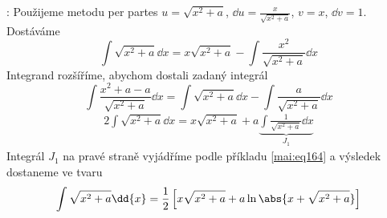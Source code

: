 \begin{mdframed}[style=mdmathsolution]
  [\ref{mai:eq143}]: Použijeme metodu per partes \(u =\sqrt{x^2+a}\), \(\dd{u} =
  \frac{x}{\sqrt{x^2+a}}\), \(v = x\), \(\dd{v} = 1\).  Dostáváme
  \begin{equation*}
    \int{\sqrt{x^2+a}\dd{x}} = x\sqrt{x^2+a}-\int{\frac{x^2}{\sqrt{x^2+a}}\dd{x}}
  \end{equation*}
  Integrand rozšíříme, abychom dostali zadaný integrál 
  \begin{equation*}
      \int\frac{x^2+a-a}{\sqrt{x^2+a}}\dd{x} 
        = \int{\sqrt{x^2+a}\dd{x}} - \int{\frac{a}{\sqrt{x^2+a}}\dd{x}}                   
  \end{equation*}
  \begin{align*}
    2\!\int{\sqrt{x^2+a}\dd{x}} 
      = x\sqrt{x^2+a}+a\underbrace{\int{\frac{1}{\sqrt{x^2+a}}}\dd{x}}_{J_1}
  \end{align*}    
  Integrál \(J_1\) na pravé straně vyjádříme podle příkladu \ref{mai:eq164} a výsledek
  dostaneme ve tvaru
  \begin{gather*}
    \int\sqrt{x^2+a}\dd{x}
        =\frac{1}{2}\left[x\sqrt{x^2+a}+a\ln{\abs{x + \sqrt{x^2+a}}}\right]
  \end{gather*}
\end{mdframed}